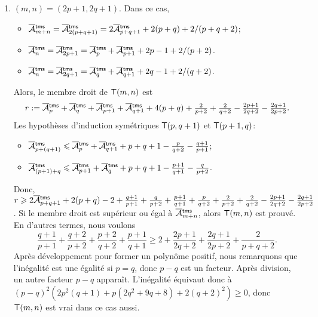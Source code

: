 \begin{enumerate}
  \item \((m,n) = (2p+1,2q+1)\). Dans ce cas,
    \begin{itemize}

      \item \(\OM{\fun{tms}}{m+n} = \OM{\fun{tms}}{2(p+q+1)} =
        2\OM{\fun{tms}}{p+q+1} + 2(p+q) + 2/(p+q+2)\);

      \item \(\OM{\fun{tms}}{n} = \OM{\fun{tms}}{2p+1} =
        \OM{\fun{tms}}{p} + \OM{\fun{tms}}{p+1} + 2p - 1 + 2/(p+2)\).

      \item \(\OM{\fun{tms}}{n} = \OM{\fun{tms}}{2q+1} =
        \OM{\fun{tms}}{q} + \OM{\fun{tms}}{q+1} + 2q - 1 + 2/(q+2)\).

    \end{itemize}
    Alors, le membre droit de \(\textsf{T}({m,n})\) est
    \begin{equation*}
      r := \OM{\fun{tms}}{p} + \OM{\fun{tms}}{q} + \OM{\fun{tms}}{p+1}
      + \OM{\fun{tms}}{q+1} + 4(p+q) + \tfrac{2}{p+2} + \tfrac{2}{q+2}
      - \tfrac{2p+1}{2q+2} - \tfrac{2q+1}{2p+2}.
    \end{equation*}
    Les hypothèses d'induction symétriques \(\textsf{T}({p,q+1})\) et
    \(\textsf{T}({p+1,q})\):
    \begin{itemize}

      \item \(\OM{\fun{tms}}{p+(q+1)} \leqslant \OM{\fun{tms}}{p} +
        \OM{\fun{tms}}{q+1} + p + q + 1 - \tfrac{p}{q+2}
        - \tfrac{q+1}{p+1}\);

      \item \(\OM{\fun{tms}}{(p+1)+q} \leqslant \OM{\fun{tms}}{p+1} +
        \OM{\fun{tms}}{q} + p + q + 1 - \tfrac{p+1}{q+1} -
        \tfrac{q}{p+2}\).

    \end{itemize}
    Donc, \(r \geqslant 2\OM{\fun{tms}}{p+q+1} + 2(p+q) - 2 +
    \tfrac{q+1}{p+1} + \tfrac{q}{p+2} + \tfrac{p+1}{q+1} +
    \tfrac{p}{q+2} + \tfrac{2}{p+2} + \tfrac{2}{q+2} -
    \tfrac{2p+1}{2q+2} - \tfrac{2q+1}{2p+2}\). Si le membre droit est
    supérieur ou égal à \(\OM{\fun{tms}}{m+n}\), alors
    \(\textsf{T}({m,n})\) est prouvé. En d'autres termes, nous voulons
    \begin{equation*}
      \frac{q+1}{p+1} + \frac{q+2}{p+2} + \frac{p+2}{q+2} +
      \frac{p+1}{q+1} \geqslant 2 + \frac{2p+1}{2q+2} +
      \frac{2q+1}{2p+2} + \frac{2}{p+q+2}.
    \end{equation*}
    Après développement pour former un polynôme positif, nous
    remarquons que l'inégalité est une égalité si \(p=q\), donc
    \(p-q\) est un facteur. Après division, un autre facteur \(p-q\)
    apparaît. L'inégalité équivaut donc à \((p-q)^2(2p^2(q+1) + p(2q^2
    + 9q + 8) + 2(q+2)^2) \geqslant 0\), donc \(\textsf{T}({m,n})\) est
    vrai dans ce cas aussi.

\end{enumerate}
